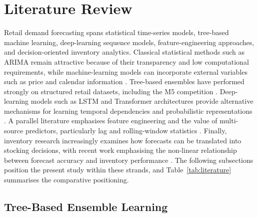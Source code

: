 \section{Literature Review}

Retail demand forecasting spans statistical time-series models, tree-based machine learning, deep-learning sequence models, feature-engineering approaches, and decision-oriented inventory analytics.
Classical statistical methods such as ARIMA remain attractive because of their transparency and low computational requirements, while machine-learning models can incorporate external variables such as price and calendar information \cite{Petropoulos2022ForecastingTheory,Makridakis2018M4}.
Tree-based ensembles have performed strongly on structured retail datasets, including the M5 competition \cite{Breiman2001RF,Chen2016XGBoost,Makridakis2022M5}.
Deep-learning models such as LSTM and Transformer architectures provide alternative mechanisms for learning temporal dependencies and probabilistic representations \cite{Theodoridis2025LSTMixer,Lim2021TFT}.
A parallel literature emphasises feature engineering and the value of multi-source predictors, particularly lag and rolling-window statistics \cite{Nguyen2025SupplyChainML,Bergsma2025InventoryML}.
Finally, inventory research increasingly examines how forecasts can be translated into stocking decisions, with recent work emphasising the non-linear relationship between forecast accuracy and inventory performance \cite{Bergsma2025InventoryML,Theodorou2025Inventory}.
The following subsections position the present study within these strands, and Table~\ref{tab:literature} summarises the comparative positioning.

\subsection{Tree-Based Ensemble Learning}

